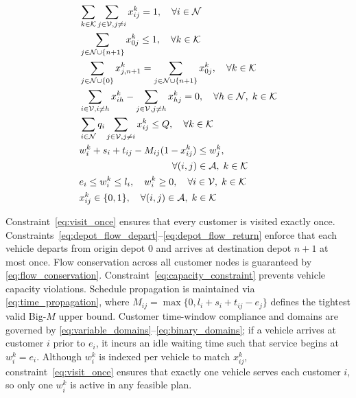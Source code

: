 \documentclass{ieeeaccess}
\begin{document}
\begin{align}
  &\sum_{k \in \mathcal{K}} \sum_{j \in \mathcal{V}, j \neq i} x_{ij}^k = 1, \quad \forall i \in \mathcal{N} \label{eq:visit_once} \\
  &\sum_{j \in \mathcal{N} \cup \{n+1\}} x_{0j}^k \le 1, \quad \forall k \in \mathcal{K} \label{eq:depot_flow_depart} \\
  &\sum_{j \in \mathcal{N} \cup \{0\}} x_{j, n+1}^k = \sum_{j \in \mathcal{N} \cup \{n+1\}} x_{0j}^k, \quad \forall k \in \mathcal{K} \label{eq:depot_flow_return} \\
  &\sum_{i \in \mathcal{V}, i \neq h} x_{ih}^k - \sum_{j \in \mathcal{V}, j \neq h} x_{hj}^k = 0, \quad \forall h \in \mathcal{N}, \; k \in \mathcal{K} \label{eq:flow_conservation} \\
  &\sum_{i \in \mathcal{N}} q_i \sum_{j \in \mathcal{V}, j \neq i} x_{ij}^k \le Q, \quad \forall k \in \mathcal{K} \label{eq:capacity_constraint} \\
  &w_i^k + s_i + t_{ij} - M_{ij} (1 - x_{ij}^k) \le w_j^k, \nonumber \\
  &\hspace{3.4cm} \forall (i, j) \in \mathcal{A}, \; k \in \mathcal{K} \label{eq:time_propagation} \\
  &e_i \le w_i^k \le l_i, \quad w_i^k \ge 0, \quad \forall i \in \mathcal{V}, \; k \in \mathcal{K} \label{eq:variable_domains} \\
  &x_{ij}^k \in \{0, 1\}, \quad \forall (i, j) \in \mathcal{A}, \; k \in \mathcal{K} \label{eq:binary_domains}
\end{align}

Constraint~\eqref{eq:visit_once} ensures that every customer is visited exactly once. Constraints~\eqref{eq:depot_flow_depart}--\eqref{eq:depot_flow_return} enforce that each vehicle departs from origin depot $0$ and arrives at destination depot $n+1$ at most once. Flow conservation across all customer nodes is guaranteed by \eqref{eq:flow_conservation}. Constraint~\eqref{eq:capacity_constraint} prevents vehicle capacity violations. Schedule propagation is maintained via \eqref{eq:time_propagation}, where $M_{ij} = \max\{0, l_i + s_i + t_{ij} - e_j\}$ defines the tightest valid Big-$M$ upper bound. Customer time-window compliance and domains are governed by \eqref{eq:variable_domains}--\eqref{eq:binary_domains}; if a vehicle arrives at customer $i$ prior to $e_i$, it incurs an idle waiting time such that service begins at $w_i^k = e_i$. Although $w_i^k$ is indexed per vehicle to match $x_{ij}^k$, constraint~\eqref{eq:visit_once} ensures that exactly one vehicle serves each customer $i$, so only one $w_i^k$ is active in any feasible plan.
\end{document}
